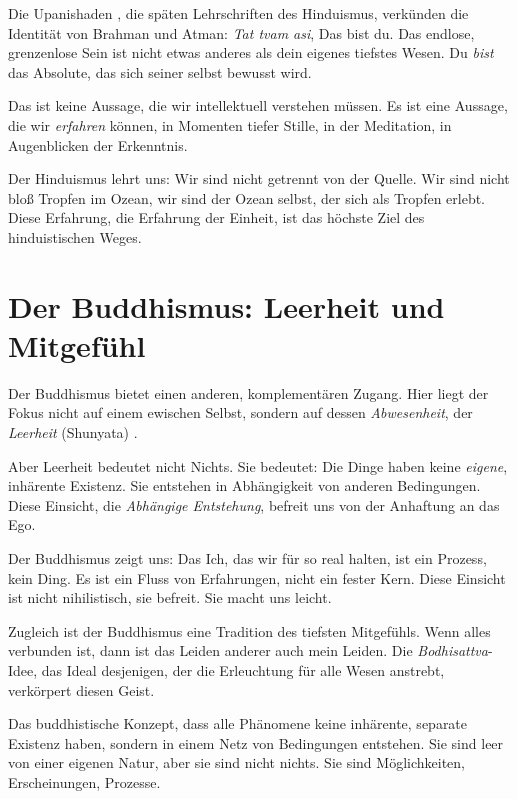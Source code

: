 Die Upanishaden \cite{Upanishads800}, die späten Lehrschriften des Hinduismus, verkünden die Identität von Brahman und Atman: \emph{Tat tvam asi}, \glqq Das bist du.\grqq{} Das endlose, grenzenlose Sein ist nicht etwas anderes als dein eigenes tiefstes Wesen. Du \emph{bist} das Absolute, das sich seiner selbst bewusst wird.

Das ist keine Aussage, die wir intellektuell verstehen müssen. Es ist eine Aussage, die wir \emph{erfahren} können, in Momenten tiefer Stille, in der Meditation, in Augenblicken der Erkenntnis.

Der Hinduismus lehrt uns: Wir sind nicht getrennt von der Quelle. Wir sind nicht bloß Tropfen im Ozean, wir sind der Ozean selbst, der sich als Tropfen erlebt. Diese Erfahrung, die Erfahrung der Einheit, ist das höchste Ziel des hinduistischen Weges.

\section{Der Buddhismus: Leerheit und Mitgefühl}

Der Buddhismus bietet einen anderen, komplementären Zugang. Hier liegt der Fokus nicht auf einem ewischen Selbst, sondern auf dessen \emph{Abwesenheit}, der \emph{Leerheit} (Shunyata) \cite{BuddhismEmptiness}.

Aber Leerheit bedeutet nicht Nichts. Sie bedeutet: Die Dinge haben keine \emph{eigene}, inhärente Existenz. Sie entstehen in Abhängigkeit von anderen Bedingungen. Diese Einsicht, die \emph{Abhängige Entstehung}, befreit uns von der Anhaftung an das Ego.

Der Buddhismus zeigt uns: Das Ich, das wir für so real halten, ist ein Prozess, kein Ding. Es ist ein Fluss von Erfahrungen, nicht ein fester Kern. Diese Einsicht ist nicht nihilistisch, sie befreit. Sie macht uns leicht.

Zugleich ist der Buddhismus eine Tradition des tiefsten Mitgefühls. Wenn alles verbunden ist, dann ist das Leiden anderer auch mein Leiden. Die \emph{Bodhisattva}-Idee, das Ideal desjenigen, der die Erleuchtung für alle Wesen anstrebt, verkörpert diesen Geist.

\begin{defi}
	Das buddhistische Konzept, dass alle Phänomene keine inhärente, separate Existenz haben, sondern in einem Netz von Bedingungen entstehen. Sie sind \glqq leer\grqq{} von einer \glqq eigenen\grqq{} Natur, aber sie sind nicht \glqq nichts\grqq{}. Sie sind Möglichkeiten, Erscheinungen, Prozesse.
\end{defi}

